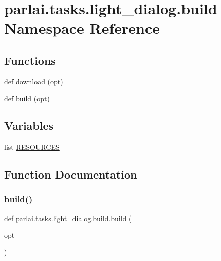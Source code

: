 \hypertarget{namespaceparlai_1_1tasks_1_1light__dialog_1_1build}{}\section{parlai.\+tasks.\+light\+\_\+dialog.\+build Namespace Reference}
\label{namespaceparlai_1_1tasks_1_1light__dialog_1_1build}
\subsection*{Functions}
\begin{DoxyCompactItemize}
\item 
def \hyperlink{namespaceparlai_1_1tasks_1_1light__dialog_1_1build_af4e1d56472312e493c43483a2dfff5a3}{download} (opt)
\item 
def \hyperlink{namespaceparlai_1_1tasks_1_1light__dialog_1_1build_ac8ebc5da2dd660257535226b26afb26e}{build} (opt)
\end{DoxyCompactItemize}
\subsection*{Variables}
\begin{DoxyCompactItemize}
\item 
list \hyperlink{namespaceparlai_1_1tasks_1_1light__dialog_1_1build_a4153cf00ec4b1740f5f47b575291849d}{R\+E\+S\+O\+U\+R\+C\+ES}
\end{DoxyCompactItemize}


\subsection{Function Documentation}
\mbox{\label{namespaceparlai_1_1tasks_1_1light__dialog_1_1build_ac8ebc5da2dd660257535226b26afb26e}} 
\subsubsection{\texorpdfstring{build()}{build()}}
{\footnotesize\ttfamily def parlai.\+tasks.\+light\+\_\+dialog.\+build.\+build (\begin{DoxyParamCaption}\item[{}]{opt }\end{DoxyParamCaption})}

